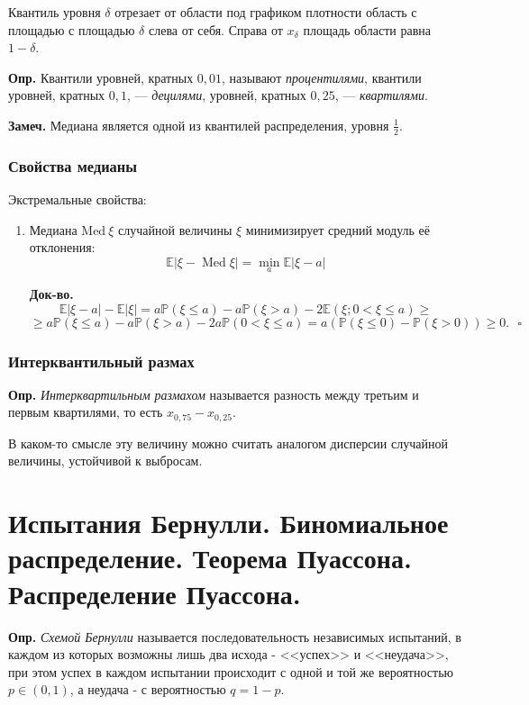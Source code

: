 \documentclass[oneside,final,14pt]{extreport}
\newcommand\mydef{{\bf Опр.}}
\newcommand\mynote{{\bf Замеч.}}
\newcommand\myqed{{\bf Док-во.}}
\newcommand\myprob[1]{{\mathbb{P}(#1)}}
\theoremstyle{definition}
\begin{document}
Квантиль уровня $\delta$ отрезает от области под графиком плотности область с площадью с площадью $\delta$ слева от себя. Справа от $x_\delta$ площадь области равна $1 - \delta$.

\mydef{} Квантили уровней, кратных $0,01$, называют {\it процентилями}, квантили уровней, кратных $0,1$, — {\it децилями}, уровней, кратных $0,25$, — {\it квартилями}.

\mynote{} Медиана является одной из квантилей распределения, уровня $\frac{1}{2}.$

\subsubsection{Свойства медианы}

Экстремальные свойства:

\begin{enumerate}
    \item Медиана $\mathrm{Med}~\xi$ случайной величины $\xi$ минимизирует средний модуль её отклонения:
    $$\mathbb{E}|\xi-\operatorname{Med} \xi|=\min _{a} \mathbb{E}|\xi-a|$$
    
    \myqed{}
    $$\mathbb{E}|\xi - a| - \mathbb{E}|\xi| = a\myprob{\xi \leqslant a} - a\myprob{\xi > a} - 2\mathbb{E}(\xi; 0 < \xi \leqslant a) \geqslant$$ $$\geqslant a\myprob{\xi \leqslant a} - a\myprob{\xi > a} - 2a\myprob{0 < \xi \leqslant a} = a(\myprob{\xi \leqslant 0} - \myprob{\xi > 0}) \geqslant 0. ~~~\square $$
\end{enumerate}

\subsubsection{Интерквантильный размах}

\mydef{} {\it Интерквартильным размахом} называется разность между третьим и первым квартилями, то есть ${\displaystyle x_{0{,}75}-x_{0{,}25}}.$

В каком-то смысле эту величину можно считать аналогом дисперсии случайной величины, устойчивой к выбросам.

\section {Испытания Бернулли. Биномиальное распределение. Теорема Пуассона. Распределение Пуассона.}

\mydef{} {\it Схемой Бернулли} называется последовательность независимых испытаний, в каждом из которых возможны лишь два исхода - <<успех>> и <<неудача>>, при этом успех в каждом испытании происходит с одной и той же вероятностью $p \in (0,1)$, а неудача - с вероятностью $q = 1 - p.$
\end{document}
